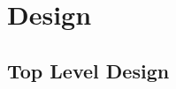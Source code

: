 \documentclass{swfcthesisp}
\begin{document}

\chapter{Design}

\section{Top Level Design}
\label{sec:top-level-design}
\end{document}
